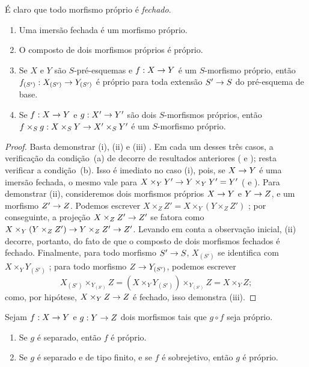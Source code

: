 \documentclass[oneside,10pt]{amsart}
\makeatletter
\newcommand{\ega@arrow}[2]{\mathchoice{#1}{#2}{#2}{#2}}
\renewcommand{\to}{\ega@arrow{\longrightarrow}{\rightarrow}}
\newcommand{\oldpage}[2][]{\marginnote{\normalfont\footnotesize\textbf{#1}~|~#2}\ignorespaces}
\let\EGAOriginalLabel\label
\renewcommand{\label}[1]{\phantomsection\EGAOriginalLabel{#1}}
\makeatother
\begin{document}
É claro que todo morfismo próprio é \emph{fechado}.

\begin{proposition}[5.4.2]
\label{II.5.4.2}
\medskip\noindent
\begin{enumerate}
  \item[{\rm(i)}] Uma imersão fechada é um morfismo próprio.
  \item[{\rm(ii)}] O composto de dois morfismos próprios é próprio.
  \item[{\rm(iii)}] Se $X$ e $Y$ são $S$-pré-esquemas e $f:X\to Y$ é um $S$-morfismo próprio, então $f_{(S')}:X_{(S')}\to Y_{(S')}$ é próprio para toda extensão $S'\to S$ do pré-esquema de base.
  \item[{\rm(iv)}] Se $f:X\to Y$ e $g:X'\to Y'$ são dois $S$-morfismos próprios, então $f\times_S g:X\times_S Y\to X'\times_S Y'$ é um $S$-morfismo próprio.
\end{enumerate}
\end{proposition}
\oldpage[II]{101}
\begin{proof}
Basta demonstrar (i), (ii) e (iii) .
Em cada um desses três casos, a verificação da condição~(a) de  decorre de resultados anteriores ( e ); resta verificar a condição~(b).
Isso é imediato no caso (i), pois, se $X\to Y$ é uma imersão fechada, o mesmo vale para $X\times_Y Y'\to Y\times_Y Y'=Y'$ ( e ).
Para demonstrar (ii), consideremos dois morfismos próprios $X\to Y$ e $Y\to Z$, e um morfismo $Z'\to Z$.
Podemos escrever $X\times_Z Z'=X\times_Y(Y\times_Z Z')$ ; por conseguinte, a projeção $X\times_Z Z'\to Z'$ se fatora como $X\times_Y(Y\times_Z Z')\to Y\times_Z Z'\to Z'$.
Levando em conta a observação inicial, (ii) decorre, portanto, do fato de que o composto de dois morfismos fechados é fechado.
Finalmente, para todo morfismo $S'\to S$, $X_{(S')}$ se identifica com $X\times_Y Y_{(S')}$ ; para todo morfismo $Z\to Y_{(S')}$, podemos escrever
\[
  X_{(S')}\times_{Y_{(S')}}Z=(X\times_Y Y_{(S')})\times_{Y_{(S')}}Z=X\times_Y Z;
\]
como, por hipótese, $X\times_Y Z\to Z$ é fechado, isso demonstra (iii).
\end{proof}

\begin{corollary}[5.4.3]
\label{II.5.4.3}
Sejam $f:X\to Y$ e $g:Y\to Z$ dois morfismos tais que $g\circ f$ seja próprio.
\begin{enumerate}
  \item[{\rm(i)}] Se $g$ é separado, então $f$ é próprio.
  \item[{\rm(ii)}] Se $g$ é separado e de tipo finito, e se $f$ é sobrejetivo, então $g$ é próprio.
\end{enumerate}
\end{corollary}
\end{document}
